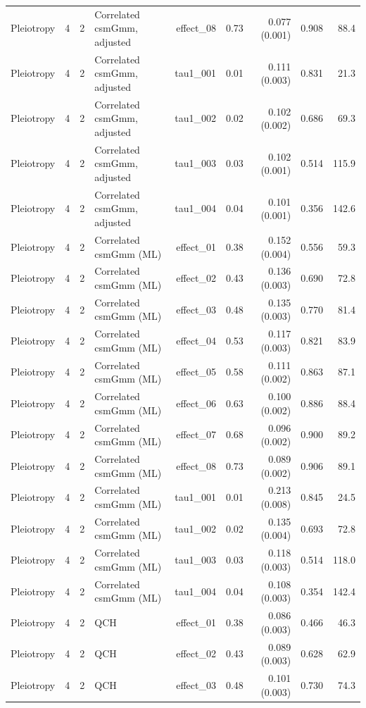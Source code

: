 \begin{longtable}{lcclrrrrr}
Pleiotropy & 4 & 2 & Correlated csmGmm, adjusted & effect\_08 & 0.73 & 0.077 (0.001) & 0.908 & 88.4\\
Pleiotropy & 4 & 2 & Correlated csmGmm, adjusted & tau1\_001 & 0.01 & 0.111 (0.003) & 0.831 & 21.3\\
Pleiotropy & 4 & 2 & Correlated csmGmm, adjusted & tau1\_002 & 0.02 & 0.102 (0.002) & 0.686 & 69.3\\
Pleiotropy & 4 & 2 & Correlated csmGmm, adjusted & tau1\_003 & 0.03 & 0.102 (0.001) & 0.514 & 115.9\\
Pleiotropy & 4 & 2 & Correlated csmGmm, adjusted & tau1\_004 & 0.04 & 0.101 (0.001) & 0.356 & 142.6\\
Pleiotropy & 4 & 2 & Correlated csmGmm (ML) & effect\_01 & 0.38 & 0.152 (0.004) & 0.556 & 59.3\\
Pleiotropy & 4 & 2 & Correlated csmGmm (ML) & effect\_02 & 0.43 & 0.136 (0.003) & 0.690 & 72.8\\
Pleiotropy & 4 & 2 & Correlated csmGmm (ML) & effect\_03 & 0.48 & 0.135 (0.003) & 0.770 & 81.4\\
Pleiotropy & 4 & 2 & Correlated csmGmm (ML) & effect\_04 & 0.53 & 0.117 (0.003) & 0.821 & 83.9\\
Pleiotropy & 4 & 2 & Correlated csmGmm (ML) & effect\_05 & 0.58 & 0.111 (0.002) & 0.863 & 87.1\\
Pleiotropy & 4 & 2 & Correlated csmGmm (ML) & effect\_06 & 0.63 & 0.100 (0.002) & 0.886 & 88.4\\
Pleiotropy & 4 & 2 & Correlated csmGmm (ML) & effect\_07 & 0.68 & 0.096 (0.002) & 0.900 & 89.2\\
Pleiotropy & 4 & 2 & Correlated csmGmm (ML) & effect\_08 & 0.73 & 0.089 (0.002) & 0.906 & 89.1\\
Pleiotropy & 4 & 2 & Correlated csmGmm (ML) & tau1\_001 & 0.01 & 0.213 (0.008) & 0.845 & 24.5\\
Pleiotropy & 4 & 2 & Correlated csmGmm (ML) & tau1\_002 & 0.02 & 0.135 (0.004) & 0.693 & 72.8\\
Pleiotropy & 4 & 2 & Correlated csmGmm (ML) & tau1\_003 & 0.03 & 0.118 (0.003) & 0.514 & 118.0\\
Pleiotropy & 4 & 2 & Correlated csmGmm (ML) & tau1\_004 & 0.04 & 0.108 (0.003) & 0.354 & 142.4\\
Pleiotropy & 4 & 2 & QCH & effect\_01 & 0.38 & 0.086 (0.003) & 0.466 & 46.3\\
Pleiotropy & 4 & 2 & QCH & effect\_02 & 0.43 & 0.089 (0.003) & 0.628 & 62.9\\
Pleiotropy & 4 & 2 & QCH & effect\_03 & 0.48 & 0.101 (0.003) & 0.730 & 74.3\\

\end{longtable}
